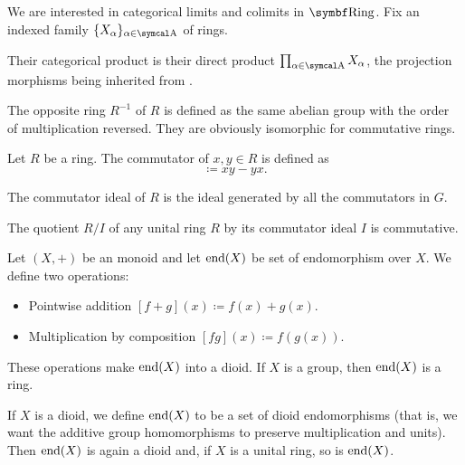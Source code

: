 \begin{proposition}\label{thm:ring_categorical_limits}
  We are interested in categorical limits and colimits in \( \Cat{Ring} \). Fix an indexed family  \( \{ X_\al \}_{\al \in \CA} \) of rings.
  \begin{defenum}
     Their categorical product is their direct product \( \prod_{\al \in \CA} X_\al \), the projection morphisms being inherited from .
  \end{defenum}
\end{proposition}

\begin{definition}\label{def:opposite_ring}\cite[555]{Knapp2016BAlg}
  The opposite ring \( R^{-1} \) of \( R \) is defined as the same abelian group with the order of multiplication reversed. They are obviously isomorphic for commutative rings.
\end{definition}

\begin{definition}\label{def:ring_commutator}
  Let \( R \) be a ring. The commutator of \( x, y \in R \) is defined as
  \begin{equation*}
    [x, y] \coloneqq xy - yx.
  \end{equation*}

  The commutator ideal of \( R \) is the ideal generated by all the commutators in \( G \).
\end{definition}

\begin{proposition}\label{thm:quotient_by_commutator_ideal}
  The quotient \( R / I \) of any unital ring \( R \) by its commutator ideal \( I \) is commutative.
\end{proposition}

\begin{definition}\label{def:endomorphism_dioid}
  Let \( (X, +) \) be an monoid and let \( \operatorname{end}(X) \) be set of endomorphism over \( X \). We define two operations:
  \begin{itemize}
    \item Pointwise addition \( [f + g](x) \coloneqq f(x) + g(x) \).
    \item Multiplication by composition \( [fg](x) \coloneqq f(g(x)) \).
  \end{itemize}

  These operations make \( \operatorname{end}(X) \) into a dioid. If \( X \) is a group, then \( \operatorname{end}(X) \) is a ring.

  If \( X \) is a dioid, we define \( \operatorname{end}(X) \) to be a set of dioid endomorphisms (that is, we want the additive group homomorphisms to preserve multiplication and units). Then \( \operatorname{end}(X) \) is again a dioid and, if \( X \) is a unital ring, so is \( \operatorname{end}(X) \).
\end{definition}

